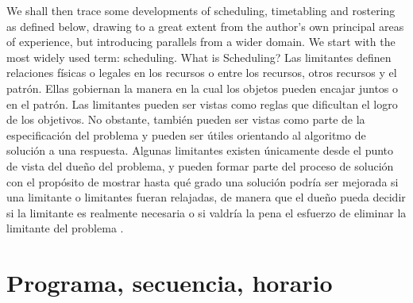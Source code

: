 \documentclass[draft,12pt,headsepline,footsepline,paper=letter]{scrreprt}
\begin{document}
We shall then trace some developments of scheduling, timetabling and rostering as defined below, drawing to a great extent from the author's own principal areas of experience, but introducing parallels from a wider domain.
We start with the most widely used term: scheduling. What is Scheduling?
\fi
Las limitantes definen relaciones físicas o legales en los recursos o entre los recursos, otros recursos y el patrón. Ellas gobiernan la manera en la cual los objetos pueden encajar juntos o en el patrón. Las limitantes pueden ser vistas como reglas que dificultan el logro de los objetivos. No obstante, también pueden ser vistas como parte de la especificación del problema y pueden ser útiles orientando al algoritmo de solución a una respuesta. Algunas limitantes existen únicamente desde el punto de vista del dueño del problema, y pueden formar parte del proceso de solución con el propósito de mostrar hasta qué grado una solución podría ser mejorada si una limitante o limitantes fueran relajadas, de manera que el dueño pueda decidir si la limitante es realmente necesaria o si valdría la pena el esfuerzo de eliminar la limitante del problema \citep[p.~48]{wren95scheduling-timetabling}.

\section{Programa, secuencia, horario}
\label{sec:programa_secuencia_horario}
\end{document}
